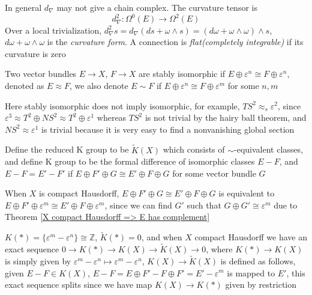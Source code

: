 \documentclass[main]{subfiles}
\begin{document}
\begin{definition}[Curvature]
In general $d_\nabla$ may not give a chain complex. The curvature tensor is
\[d_\nabla^2:\Omega^0(E)\to\Omega^2(E)\]
Over a local trivialization, $d_\nabla^2s=d_\nabla(ds+\omega\wedge s)=(d\omega+\omega\wedge\omega)\wedge s$, $d\omega+\omega\wedge\omega$ is the \textit{curvature form}. A connection is \textit{flat(completely integrable)} if its curvature is zero
\end{definition}

\begin{definition}
Two vector bundles $E\to X$, $F\to X$ are stably isomorphic if $E\oplus\varepsilon^n\cong F\oplus\varepsilon^n$, denoted as $E\approx F$, we also denote $E\sim F$ if $E\oplus\varepsilon^n\cong F\oplus\varepsilon^m$ for some $n,m$
\end{definition}

\begin{remark}
Here stably isomorphic does not imply isomorphic, for example, $TS^2\approx_s\varepsilon^2$, since $\varepsilon^3\approx T^2\oplus NS^2\approx T^2\oplus\varepsilon^1$ whereas $TS^2$ is not trivial by the hairy ball theorem, and $NS^2\approx\varepsilon^1$ is trivial because it is very easy to find a nonvanishing global section
\end{remark}

\begin{definition}
Define the reduced K group to be $\tilde K(X)$ which consists of $\sim$-equivalent classes, and define K group to be the formal difference of isomorphic classes $E-F$, and $E-F=E'-F'$ if $E\oplus F'\oplus G\cong E'\oplus F\oplus G$ for some vector bundle $G$
\end{definition}

\begin{remark}
When $X$ is compact Hausdorff, $E\oplus F'\oplus G\cong E'\oplus F\oplus G$ is equivalent to $E\oplus F'\oplus \varepsilon^m\cong E'\oplus F\oplus \varepsilon^m$, since we can find $G'$ such that $G\oplus G'\cong\varepsilon^m$ due to Theorem \ref{X compact Hausdorff => E has complement} \par
$K(*)=\{\varepsilon^m-\varepsilon^n\}\cong\mathbb Z$, $\tilde K(*)=0$, and when $X$ compact Hausdorff we have an exact sequence $0\to K(*)\to K(X)\to \tilde K(X)\to 0$, where $K(*)\to K(X)$ is simply given by $\varepsilon^m-\varepsilon^n\mapsto\varepsilon^m-\varepsilon^n$, $K(X)\to \tilde K(X)$ is defined as follows, given $E-F\in K(X)$, $E-F=E\oplus F'-F\oplus F'=E'-\varepsilon^m$ is mapped to $E'$, this exact sequence splits since we have map $K(X)\to K(*)$ given by restriction
\end{remark}
\end{document}
